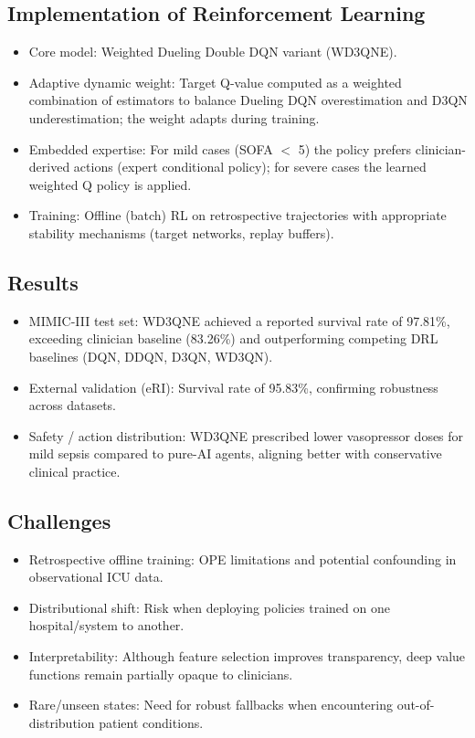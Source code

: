 \subsection*{Implementation of Reinforcement Learning}
\begin{itemize}
    \item Core model: Weighted Dueling Double DQN variant (WD3QNE).
    \item Adaptive dynamic weight: Target Q-value computed as a weighted combination of estimators to balance Dueling DQN overestimation and D3QN underestimation; the weight adapts during training.
    \item Embedded expertise: For mild cases (SOFA $<$ 5) the policy prefers clinician-derived actions (expert conditional policy); for severe cases the learned weighted Q policy is applied.
    \item Training: Offline (batch) RL on retrospective trajectories with appropriate stability mechanisms (target networks, replay buffers).
\end{itemize}

\subsection*{Results}
\begin{itemize}
    \item MIMIC-III test set: WD3QNE achieved a reported survival rate of 97.81\%, exceeding clinician baseline (83.26\%) and outperforming competing DRL baselines (DQN, DDQN, D3QN, WD3QN).
    \item External validation (eRI): Survival rate of 95.83\%, confirming robustness across datasets.
    \item Safety / action distribution: WD3QNE prescribed lower vasopressor doses for mild sepsis compared to pure-AI agents, aligning better with conservative clinical practice.
\end{itemize}

\subsection*{Challenges}
\begin{itemize}
    \item Retrospective offline training: OPE limitations and potential confounding in observational ICU data.
    \item Distributional shift: Risk when deploying policies trained on one hospital/system to another.
    \item Interpretability: Although feature selection improves transparency, deep value functions remain partially opaque to clinicians.
    \item Rare/unseen states: Need for robust fallbacks when encountering out-of-distribution patient conditions.
\end{itemize}

